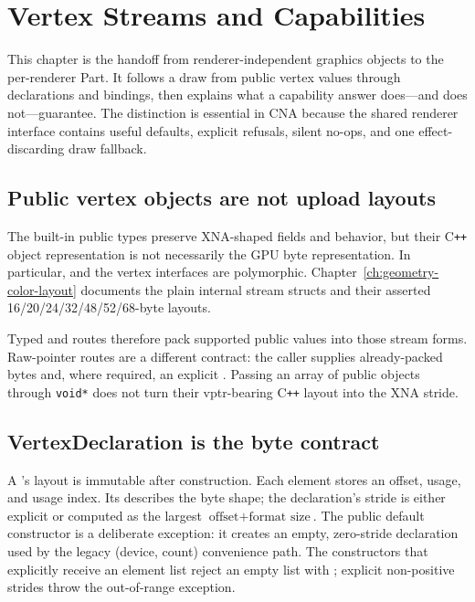 \chapter{Vertex Streams and Capabilities}
\label{ch:vertex-streams-capabilities}

This chapter is the handoff from renderer-independent graphics objects to the per-renderer Part.
It follows a draw from public vertex values through declarations and bindings, then explains what a
capability answer does---and does not---guarantee.  The distinction is essential in CNA because the
shared renderer interface contains useful defaults, explicit refusals, silent no-ops, and one
effect-discarding draw fallback.



\section{Public vertex objects are not upload layouts}

The built-in public types preserve XNA-shaped fields and  behavior, but their
C\texttt{++} object representation is not necessarily the GPU byte representation.  In particular,
 and the vertex interfaces are polymorphic.  Chapter~\ref{ch:geometry-color-layout}
documents the plain internal stream structs and their asserted 16/20/24/32/48/52/68-byte layouts.

Typed  and  routes
therefore pack supported public values into those stream forms.  Raw-pointer routes are a different
contract: the caller supplies already-packed bytes and, where required, an explicit
.  Passing an array of public objects through \texttt{void*} does not
turn their vptr-bearing C\texttt{++} layout into the XNA stride.

\section{VertexDeclaration is the byte contract}

A 's layout is immutable after construction. Each element stores an offset,
usage, and usage index.  Its  describes the byte shape; the
declaration's stride is either explicit or
computed as the largest \(\text{offset}+\text{format size}\). The public default constructor is a
deliberate exception: it creates an empty, zero-stride declaration used by the legacy
(device, count) convenience path. The constructors that explicitly receive
an element list reject an empty list with ; explicit non-positive
strides throw the out-of-range exception.

